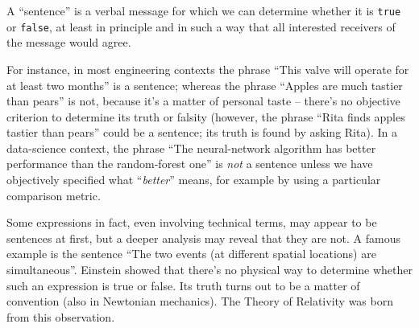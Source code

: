 \documentclass[
  a4paper,
  DIV=11,
  numbers=noendperiod,
  oneside]{scrreprt}
\begin{document}

\begin{tcolorbox}[enhanced jigsaw, colback=white, breakable, coltitle=black, bottomtitle=1mm, title={}, leftrule=.75mm, opacitybacktitle=0.6, opacityback=0, colframe=quarto-callout-note-color-frame, colbacktitle=quarto-callout-note-color!10!white, rightrule=.15mm, arc=.35mm, titlerule=0mm, toprule=.15mm, left=2mm, toptitle=1mm, bottomrule=.15mm]

{A ``sentence'' is a verbal message for which we can determine whether
it is \texttt{true} or \texttt{false}, at least in principle and in such
a way that all interested receivers of the message would agree.}

\end{tcolorbox}

For instance, in most engineering contexts the phrase ``{This valve will
operate for at least two months}'' is a sentence; whereas the phrase
``{Apples are much tastier than pears}'' is not, because it's a matter
of personal taste -- there's no objective criterion to determine its
truth or falsity (however, the phrase ``{Rita finds apples tastier than
pears}'' could be a sentence; its truth is found by asking Rita). In a
data-science context, the phrase ``{The neural-network algorithm has
better performance than the random-forest one}'' is \emph{not} a
sentence unless we have objectively specified what ``\emph{better}''
means, for example by using a particular comparison metric.

Some expressions in fact, even involving technical terms, may appear to
be sentences at first, but a deeper analysis may reveal that they are
not. A famous example is the sentence ``{The two events (at different
spatial locations) are simultaneous}''. Einstein showed that there's no
physical way to determine whether such an expression is true or false.
Its truth turns out to be a matter of convention (also in Newtonian
mechanics). The Theory of Relativity was born from this observation.
\end{document}
